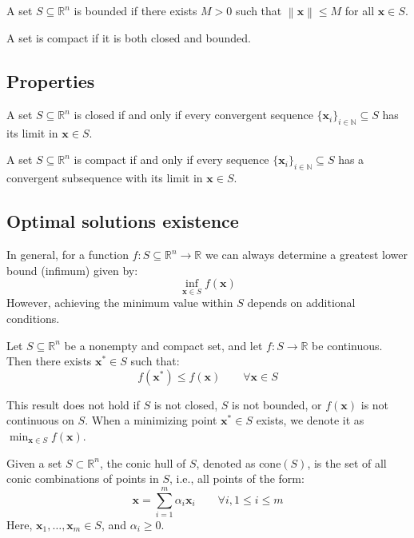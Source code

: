\begin{definition}
    A set $S \subseteq \mathbb{R}^n$ is bounded if there exists $M > 0$ such that $\left\lVert\mathbf{x}\right\rVert \leq M$ for all $\mathbf{x} \in S$.
\end{definition}

\begin{definition}
    A set is compact if it is both closed and bounded.
\end{definition}

\subsection{Properties}
\begin{property} 
    A set $S \subseteq \mathbb{R}^n$ is closed if and only if every convergent sequence $\{\mathbf{x}_i\}_{i\in\mathbb{N}} \subseteq S$ has its limit in $\mathbf{x} \in S$.
\end{property}

\begin{property} 
    A set $S \subseteq \mathbb{R}^n$ is compact if and only if every sequence $\{\mathbf{x}_i\}_{i\in\mathbb{N}} \subseteq S$ has a convergent subsequence with its limit in $\mathbf{x} \in S$.
\end{property}

\subsection{Optimal solutions existence}
In general, for a function $f : S \subseteq \mathbb{R}^n \rightarrow \mathbb{R}$ we can always determine a greatest lower bound (infimum) given by:
\[\inf_{\mathbf{x}\in S}f (\mathbf{x})\]
However, achieving the minimum value within $S$ depends on additional conditions.
\begin{theorem}
    Let $S \subseteq \mathbb{R}^n$ be a nonempty and compact set, and let $f : S \rightarrow \mathbb{R}$ be continuous. 
    Then there exists $\mathbf{x}^\ast \in S$ such that: 
    \[f (\mathbf{x}^\ast) \leq f (\mathbf{x}) \qquad\forall \mathbf{x} \in S\]
\end{theorem}
\noindent This result does not hold if $S$ is not closed, $S$ is not bounded, or $f(\mathbf{x})$ is not continuous on $S$. 
When a minimizing point $\mathbf{x}^\ast \in S$ exists, we denote it as $\min_{\mathbf{x} \in S} f(\mathbf{x})$.

\begin{definition}
    Given a set $S\subset \mathbb{R}^n$, the conic hull of $S$, denoted as $\text{cone}(S)$, is the set of all conic combinations of points in $S$, i.e., all points of the form: 
    \[\mathbf{x} = \sum_{i=1}^{m} \alpha_i \mathbf{x}_i\qquad \forall i, 1 \leq i \leq m\]
    Here, $\mathbf{x}_1, \dots, \mathbf{x}_m \in S$, and $\alpha_i \geq 0$.
\end{definition}

